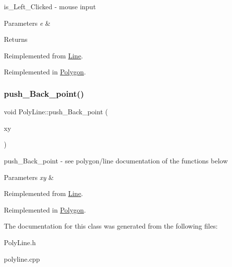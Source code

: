 is\+\_\+\+Left\+\_\+\+Clicked -\/ mouse input 


\begin{DoxyParams}{Parameters}
{\em e} & \\
\hline
\end{DoxyParams}
\begin{DoxyReturn}{Returns}

\end{DoxyReturn}


Reimplemented from \hyperlink{class_line_a79c3891fefd740e6a3cfcdb57a105995}{Line}.



Reimplemented in \hyperlink{class_polygon_ab17f2f8ae9489fba4030fbb4a99e7ea6}{Polygon}.

\mbox{\label{class_poly_line_afbc3a0e59abcd27bdb58027796e91c3a}} 
\subsubsection{\texorpdfstring{push\+\_\+\+Back\+\_\+point()}{push\_Back\_point()}}
{\footnotesize\ttfamily void Poly\+Line\+::push\+\_\+\+Back\+\_\+point (\begin{DoxyParamCaption}\item[{Q\+Point}]{xy }\end{DoxyParamCaption})\hspace{0.3cm}{\ttfamily [virtual]}}



push\+\_\+\+Back\+\_\+point -\/ see polygon/line documentation of the functions below 


\begin{DoxyParams}{Parameters}
{\em xy} & \\
\hline
\end{DoxyParams}


Reimplemented from \hyperlink{class_line_a01ac38eae66f157868daee1b4764b242}{Line}.



Reimplemented in \hyperlink{class_polygon_ad57f4b375c6858bfe34c095bfeb38d5a}{Polygon}.



The documentation for this class was generated from the following files\+:\begin{DoxyCompactItemize}
\item 
Poly\+Line.\+h\item 
polyline.\+cpp\end{DoxyCompactItemize}
